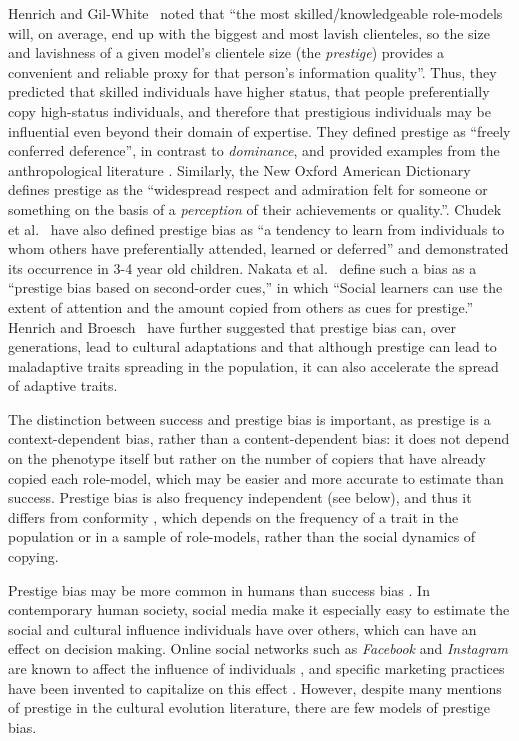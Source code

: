 \documentclass[12pt]{extarticle}
\begin{document}
Henrich and Gil-White~\citep{prestige_evolution} noted that ``the most skilled/knowledgeable role-models will, on average, end up with the biggest and most lavish clienteles, so the size and lavishness of a given model's clientele size (the \emph{prestige}) provides a convenient and reliable proxy for that person's information quality''.
Thus, they predicted that skilled individuals have higher status, that people preferentially copy high-status individuals, and therefore that prestigious individuals may be influential even beyond their domain of expertise. 
They defined prestige as ``freely conferred deference'', in contrast to \emph{dominance}, and provided examples from the anthropological literature \citep{prestige_evolution} .
Similarly, the New Oxford American Dictionary defines prestige as the ``widespread respect and admiration felt for someone or something on the basis of a \emph{perception} of their achievements or quality.''.
Chudek et al.~\citep{prestige_cultural_learning} have also defined prestige bias as ``a tendency to learn from individuals to whom others have preferentially attended, learned or deferred'' and demonstrated its occurrence in 3-4 year old children.
Nakata et al.~\citep{Nakata2024} define such a bias as a ``prestige bias based on second-order cues,'' in which ``Social learners can use the extent of attention and the amount copied from others as cues for prestige.''
Henrich and Broesch~\citep{fijian_social_bias} have further suggested that prestige bias can, over generations, lead to cultural adaptations and that although prestige can lead to maladaptive traits spreading in the population, it can also accelerate the spread of adaptive traits. 

The distinction between success and prestige bias is important, as prestige is a context-dependent bias, rather than a content-dependent bias: it does not depend on the phenotype itself but rather on the number of copiers that have already copied each role-model, which may be easier and more accurate to estimate than success. 
Prestige bias is also frequency independent (see  below), and thus it differs from conformity \citep{Denton2020,Denton2021,Denton2022}, which depends on the frequency of a trait in the population or in a sample of role-models, rather than the social dynamics of copying.

Prestige bias may be more common in humans than success bias \citep{complexityPaper}.
In contemporary human society, social media make it especially easy to estimate the social and cultural influence individuals have over others, which can have an effect on decision making. Online social networks such as \emph{Facebook} and \emph{Instagram} are known to affect the influence of individuals \citep{social_influence,social_media,influence_analysis}, and specific marketing practices have been invented to capitalize on this effect \citep{facebook_marketing}.
However, despite many mentions of prestige in the cultural evolution literature, there are few models of prestige bias. 
\end{document}

